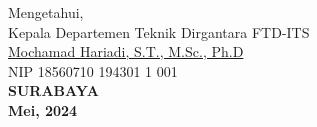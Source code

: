 \vspace{\fill}

\begin{center}
  Mengetahui,\\
  Kepala Departemen Teknik Dirgantara FTD-ITS\\
  \vspace{10ex}
  \underline{Mochamad Hariadi, S.T., M.Sc., Ph.D }\\
  NIP 18560710 194301 1 001\\
  \vspace{10ex}
  \textbf{SURABAYA} \\
  \textbf{Mei, 2024}
\end{center}
\endgroup
